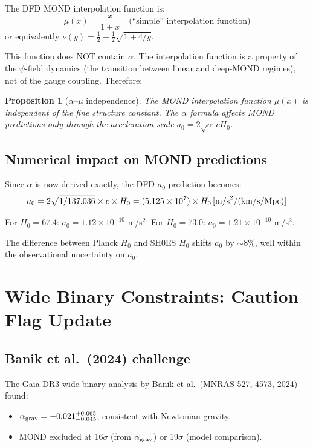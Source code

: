 \documentclass[11pt,a4paper]{article}
\newtheorem{proposition}{Proposition}
\begin{document}
The DFD MOND interpolation function is:
\begin{equation}
\mu(x) = \frac{x}{1 + x} \quad \text{(``simple'' interpolation function)}
\end{equation}
or equivalently $\nu(y) = \frac{1}{2} + \frac{1}{2}\sqrt{1 + 4/y}$.

This function does NOT contain $\alpha$. The interpolation function is a property of the $\psi$-field dynamics (the transition between linear and deep-MOND regimes), not of the gauge coupling. Therefore:

\begin{proposition}[$\alpha$--$\mu$ independence]
The MOND interpolation function $\mu(x)$ is independent of the fine structure constant. The $\alpha$ formula affects MOND predictions only through the acceleration scale $a_0 = 2\sqrt{\alpha}\,cH_0$.
\end{proposition}

\subsection{Numerical impact on MOND predictions}

Since $\alpha$ is now derived exactly, the DFD $a_0$ prediction becomes:
\begin{equation}
a_0 = 2\sqrt{1/137.036} \times c \times H_0 = (5.125 \times 10^7) \times H_0\,\text{[m/s}^2/({\rm km/s/Mpc})]
\end{equation}

For $H_0 = 67.4$: $a_0 = 1.12 \times 10^{-10}$ m/s$^2$.
For $H_0 = 73.0$: $a_0 = 1.21 \times 10^{-10}$ m/s$^2$.

The difference between Planck $H_0$ and SH0ES $H_0$ shifts $a_0$ by $\sim 8\%$, well within the observational uncertainty on $a_0$.

\section{Wide Binary Constraints: Caution Flag Update}

\subsection{Banik et al.\ (2024) challenge}

The Gaia DR3 wide binary analysis by Banik et al.\ (MNRAS 527, 4573, 2024) found:
\begin{itemize}
\item $\alpha_{\rm grav} = -0.021^{+0.065}_{-0.045}$, consistent with Newtonian gravity.
\item MOND excluded at 16$\sigma$ (from $\alpha_{\rm grav}$) or 19$\sigma$ (model comparison).
\end{itemize}
\end{document}
